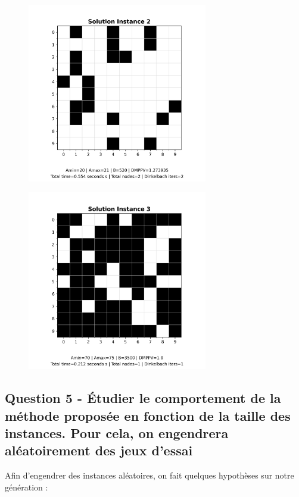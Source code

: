 \documentclass[a4paper,11pt]{article}
\begin{document}
\begin{figure}[H]
  \centering
  \includegraphics[width=0.7\textwidth]{figs/solution2_output.png}
\end{figure}

\begin{figure}[H]
  \centering
  \includegraphics[width=0.7\textwidth]{figs/solution3_output.png}
\end{figure}

\subsection{Question 5 - Étudier le comportement de la méthode proposée en fonction de la taille des instances.
Pour cela, on engendrera aléatoirement des jeux d'essai}

Afin d'engendrer des instances aléatoires, on fait quelques hypothèses sur notre génération : 
\end{document}
